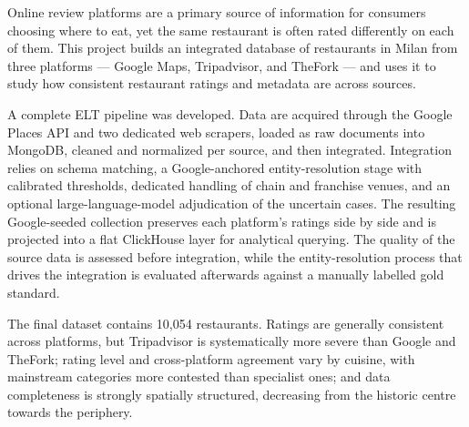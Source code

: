Online review platforms are a primary source of information for consumers choosing
where to eat, yet the same restaurant is often rated differently on each of them.
This project builds an integrated database of restaurants in Milan from three
platforms --- Google Maps, Tripadvisor, and TheFork --- and uses it to study how
consistent restaurant ratings and metadata are across sources.

A complete ELT pipeline was developed. Data are acquired through the Google Places
API and two dedicated web scrapers, loaded as raw documents into MongoDB, cleaned
and normalized per source, and then integrated. Integration relies on schema
matching, a Google-anchored entity-resolution stage with calibrated thresholds,
dedicated handling of chain and franchise venues, and an optional large-language-model
adjudication of the uncertain cases. The resulting Google-seeded collection preserves
each platform's ratings side by side and is projected into a flat ClickHouse layer for
analytical querying. The quality of the source data is assessed before integration,
while the entity-resolution process that drives the integration is evaluated
afterwards against a manually labelled gold standard.

The final dataset contains 10,054 restaurants. Ratings are generally consistent
across platforms, but Tripadvisor is systematically more severe than Google and
TheFork; rating level and cross-platform agreement vary by cuisine, with mainstream
categories more contested than specialist ones; and data completeness is strongly
spatially structured, decreasing from the historic centre towards the periphery.
